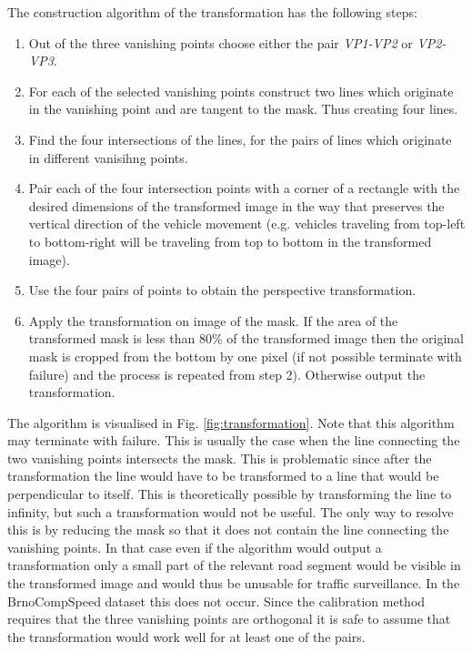 \documentclass[twocolumn]{svjour3}          \smartqed  \usepackage{graphicx}
\begin{document}
The construction algorithm of the transformation has the following steps:
\begin{enumerate}
\item Out of the three vanishing points choose either the pair \textit{VP1-VP2} or \textit{VP2-VP3}.
\item For each of the selected vanishing points construct two lines which originate in the vanishing point and are tangent to the mask. Thus creating four lines.
\item Find the four intersections of the lines, for the pairs of lines which originate in different vanisihng points.
\item Pair each of the four intersection points with a corner of a rectangle with the desired dimensions of the transformed image in the way that preserves the vertical direction of the vehicle movement (e.g. vehicles traveling from top-left to bottom-right will be traveling from top to bottom in the transformed image).
\item Use the four pairs of points to obtain the perspective transformation.
\item Apply the transformation on image of the mask. If the area of the transformed mask is less than 80\% of the transformed image then the original mask is cropped from the bottom by one pixel (if not possible terminate with failure) and the process is repeated from step 2). Otherwise output the transformation.
\end{enumerate}

The algorithm is visualised in Fig. \ref{fig:transformation}. Note that this algorithm may terminate with failure. This is usually the case when the line connecting the two vanishing points intersects the mask. This is problematic since after the transformation the line would have to be transformed to a line that would be perpendicular to itself. This is theoretically possible by transforming the line to infinity, but such a transformation would not be useful. The only way to resolve this is by reducing the mask so that it does not contain the line connecting the vanishing points. In that case even if the algorithm would output a transformation only a small part of the relevant road segment would be visible in the transformed image and would thus be unusable for traffic surveillance. In the BrnoCompSpeed dataset \cite{brnocompspeed} this does not occur. Since the calibration method requires that the three vanishing points are orthogonal it is safe to assume that the transformation would work well for at least one of the pairs.
\end{document}
